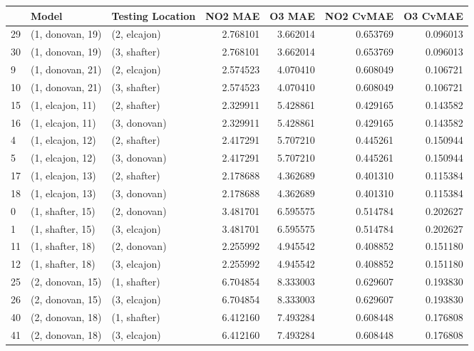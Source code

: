 \begin{tabular}{lllrrrr}
\toprule
{} &             Model & Testing Location &   NO2 MAE &    O3 MAE &  NO2 CvMAE &  O3 CvMAE \\
\midrule
29 &  (1, donovan, 19) &     (2, elcajon) &  2.768101 &  3.662014 &   0.653769 &  0.096013 \\
30 &  (1, donovan, 19) &     (3, shafter) &  2.768101 &  3.662014 &   0.653769 &  0.096013 \\
9  &  (1, donovan, 21) &     (2, elcajon) &  2.574523 &  4.070410 &   0.608049 &  0.106721 \\
10 &  (1, donovan, 21) &     (3, shafter) &  2.574523 &  4.070410 &   0.608049 &  0.106721 \\
15 &  (1, elcajon, 11) &     (2, shafter) &  2.329911 &  5.428861 &   0.429165 &  0.143582 \\
16 &  (1, elcajon, 11) &     (3, donovan) &  2.329911 &  5.428861 &   0.429165 &  0.143582 \\
4  &  (1, elcajon, 12) &     (2, shafter) &  2.417291 &  5.707210 &   0.445261 &  0.150944 \\
5  &  (1, elcajon, 12) &     (3, donovan) &  2.417291 &  5.707210 &   0.445261 &  0.150944 \\
17 &  (1, elcajon, 13) &     (2, shafter) &  2.178688 &  4.362689 &   0.401310 &  0.115384 \\
18 &  (1, elcajon, 13) &     (3, donovan) &  2.178688 &  4.362689 &   0.401310 &  0.115384 \\
0  &  (1, shafter, 15) &     (2, donovan) &  3.481701 &  6.595575 &   0.514784 &  0.202627 \\
1  &  (1, shafter, 15) &     (3, elcajon) &  3.481701 &  6.595575 &   0.514784 &  0.202627 \\
11 &  (1, shafter, 18) &     (2, donovan) &  2.255992 &  4.945542 &   0.408852 &  0.151180 \\
12 &  (1, shafter, 18) &     (3, elcajon) &  2.255992 &  4.945542 &   0.408852 &  0.151180 \\
25 &  (2, donovan, 15) &     (1, shafter) &  6.704854 &  8.333003 &   0.629607 &  0.193830 \\
26 &  (2, donovan, 15) &     (3, elcajon) &  6.704854 &  8.333003 &   0.629607 &  0.193830 \\
40 &  (2, donovan, 18) &     (1, shafter) &  6.412160 &  7.493284 &   0.608448 &  0.176808 \\
41 &  (2, donovan, 18) &     (3, elcajon) &  6.412160 &  7.493284 &   0.608448 &  0.176808 \\

\end{tabular}

